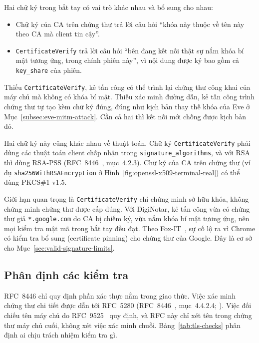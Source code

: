 Hai chữ ký trong bắt tay có vai trò khác nhau và bổ sung cho nhau:
\begin{itemize}
    \item Chữ ký của CA trên chứng thư trả lời câu hỏi ``khóa này thuộc về tên này theo CA mà client tin cậy''.
    \item \texttt{CertificateVerify} trả lời câu hỏi ``bên đang kết nối thật sự nắm khóa bí mật tương ứng, trong chính phiên này'', vì nội dung được ký bao gồm cả \texttt{key\_share} của phiên.
\end{itemize}

Thiếu \texttt{CertificateVerify}, kẻ tấn công có thể trình lại chứng thư công khai của máy chủ mà không có khóa bí mật. Thiếu xác minh đường dẫn, kẻ tấn công trình chứng thư tự tạo kèm chữ ký đúng, đúng như kịch bản thay thế khóa của Eve ở Mục~\ref{subsec:eve-mitm-attack}. Cần cả hai thì kết nối mới chống được kịch bản đó.

Hai chữ ký này cũng khác nhau về thuật toán. Chữ ký \texttt{CertificateVerify} phải dùng các thuật toán client chấp nhận trong \texttt{signature\_algorithms}, và với RSA thì dùng RSA-PSS (RFC~8446~\cite{rfc8446}, mục~4.2.3). Chữ ký của CA trên chứng thư (ví dụ \texttt{sha256WithRSAEncryption} ở Hình~\ref{fig:openssl-x509-terminal-real}) có thể dùng PKCS\#1 v1.5.

Giới hạn quan trọng là \texttt{CertificateVerify} chỉ chứng minh sở hữu khóa, không chứng minh chứng thư được cấp đúng. Với DigiNotar, kẻ tấn công vừa có chứng thư giả \texttt{*.google.com} do CA bị chiếm ký, vừa nắm khóa bí mật tương ứng, nên mọi kiểm tra mật mã trong bắt tay đều đạt. Theo Fox-IT~\cite{prins2011diginotar}, sự cố lộ ra vì Chrome có kiểm tra bổ sung (certificate pinning) cho chứng thư của Google. Đây là cơ sở cho Mục~\ref{sec:valid-signature-limits}.

\subsection{Phân định các kiểm tra}
\label{subsec:tls-checks}

RFC~8446 chỉ quy định phần xác thực nằm trong giao thức. Việc xác minh chứng thư chi tiết được dẫn tới RFC~5280 (RFC~8446~\cite{rfc8446}, mục~4.4.2.4; \cite{rfc5280}). Việc đối chiếu tên máy chủ do RFC~9525~\cite{rfc9525} quy định, và RFC này chỉ xét tên trong chứng thư máy chủ cuối, không xét việc xác minh chuỗi. Bảng~\ref{tab:tls-checks} phân định ai chịu trách nhiệm kiểm tra gì.



